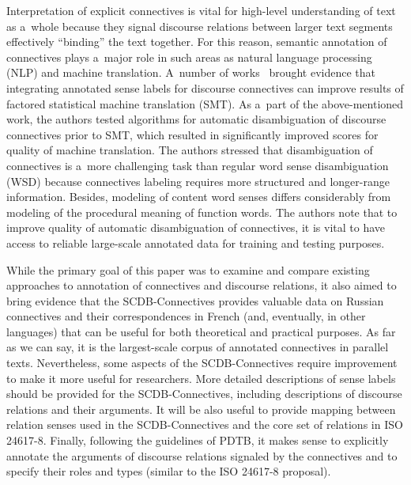 \begin{multicols}{2}
  \noindent
  Interpretation of explicit connectives is vital for high-level understanding of text as 
a~whole because they signal discourse relations between larger text segments 
effectively ``binding'' the text together. For this reason, semantic annotation of 
connectives plays a~major role in such areas as natural language processing (NLP) 
and machine translation. A~number of works~\cite{19-kr, 20-kr, 21-kr} brought 
evidence that integrating annotated sense labels for discourse connectives can 
improve results of factored statistical machine translation (SMT). As a~part of the 
above-mentioned work, the authors tested algorithms for automatic disambiguation of 
discourse connectives prior to SMT, which resulted in significantly improved scores 
for quality of machine translation. The authors stressed that disambiguation of 
connectives is a~more challenging task than regular word sense disambiguation 
(WSD) because connectives labeling requires more structured and longer-range 
information. Besides, modeling of content word senses differs considerably from 
modeling of the procedural meaning of function words. The authors note that to 
improve quality of automatic disambiguation of connectives, it is vital to have access 
to reliable large-scale annotated data for training and testing purposes. 
  
  While the primary goal of this paper was to examine and compare existing 
approaches to annotation of connectives and discourse relations, it also aimed to 
bring evidence that the SCDB-Connectives provides valuable data on Russian 
connectives and their correspondences in French (and, eventually, in other languages) 
that can be useful for both theoretical and practical purposes. As far as we can say, it 
is the largest-scale corpus of annotated connectives in parallel texts. Nevertheless, 
some aspects of the SCDB-Connectives require improvement to make it more useful 
for researchers. More detailed descriptions of sense labels should be provided for the 
SCDB-Connectives, including descriptions of discourse relations and their 
arguments. It will be also useful to provide mapping between relation senses used in 
the SCDB-Connectives and the core set of relations in ISO 24617-8. Finally, 
following the guidelines of PDTB, it makes sense to explicitly annotate the 
arguments of discourse relations signaled by the connectives and to specify their roles 
and types (similar to the ISO 24617-8 proposal).

\vspace*{-6pt}
  

\end{multicols}
